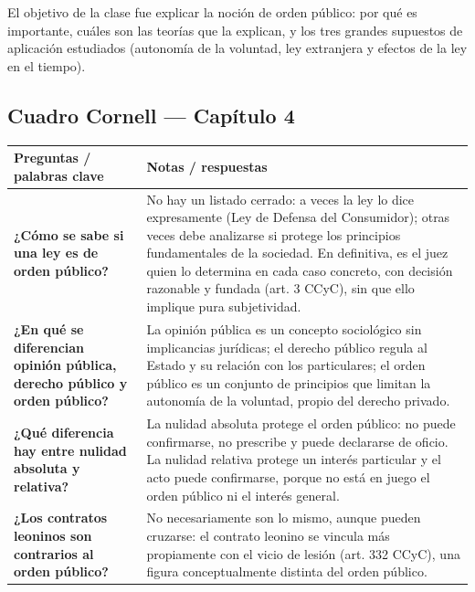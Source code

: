 \documentclass[12pt,oneside]{book}
\begin{document}
El objetivo de la clase fue explicar la noción de orden público: por qué es importante, cuáles son las teorías que la explican, y los tres grandes supuestos de aplicación estudiados (autonomía de la voluntad, ley extranjera y efectos de la ley en el tiempo).

\subsection*{Cuadro Cornell — Capítulo 4}

\begin{table}[H]
\centering
\begin{tabularx}{\textwidth}{
    >{\raggedright\arraybackslash}p{}
    >{\raggedright\arraybackslash}X
}
\toprule
\textbf{Preguntas / palabras clave} &
\textbf{Notas / respuestas} \\
\midrule

\textbf{¿Cómo se sabe si una ley es de orden público?} &
No hay un listado cerrado: a veces la ley lo dice expresamente (Ley de Defensa del Consumidor); otras veces debe analizarse si protege los principios fundamentales de la sociedad. En definitiva, es el juez quien lo determina en cada caso concreto, con decisión razonable y fundada (art. 3 CCyC), sin que ello implique pura subjetividad. \\

\textbf{¿En qué se diferencian opinión pública, derecho público y orden público?} &
La opinión pública es un concepto sociológico sin implicancias jurídicas; el derecho público regula al Estado y su relación con los particulares; el orden público es un conjunto de principios que limitan la autonomía de la voluntad, propio del derecho privado. \\

\textbf{¿Qué diferencia hay entre nulidad absoluta y relativa?} &
La nulidad absoluta protege el orden público: no puede confirmarse, no prescribe y puede declararse de oficio. La nulidad relativa protege un interés particular y el acto puede confirmarse, porque no está en juego el orden público ni el interés general. \\

\textbf{¿Los contratos leoninos son contrarios al orden público?} &
No necesariamente son lo mismo, aunque pueden cruzarse: el contrato leonino se vincula más propiamente con el vicio de lesión (art. 332 CCyC), una figura conceptualmente distinta del orden público. \\


\end{tabularx}
\end{table}
\end{document}
